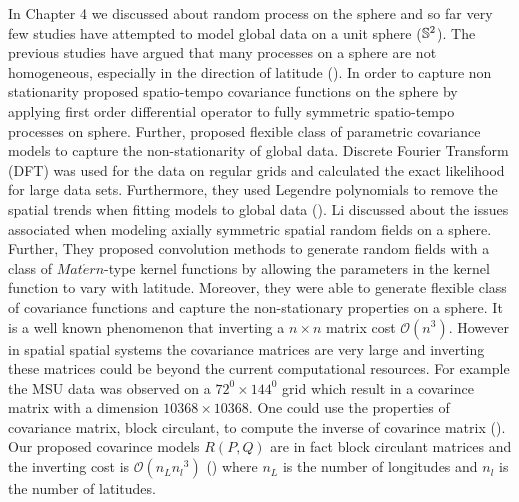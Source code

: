 
In Chapter 4 we discussed about random process on the sphere and so far very few studies have attempted to model global data on a unit sphere ($\mathbb{S}^2$). The previous studies have argued that many processes on a sphere are not homogeneous, especially in the direction of latitude (\cite{Stein2007}). In order to capture non stationarity \cite{JunStein2007} proposed spatio-tempo covariance functions on the sphere by applying first order differential operator to fully symmetric spatio-tempo processes on sphere.  Further, \cite{JunStein2008} proposed flexible class of parametric covariance models to capture the non-stationarity of global data. Discrete Fourier Transform (DFT) was used for the data on regular grids and calculated the exact likelihood for large data sets. Furthermore, they used Legendre polynomials to remove the spatial trends when fitting models to global data (\cite{Stein2007}). Li \cite{Li2013} discussed about the issues associated when modeling axially symmetric spatial random fields on a sphere. Further, They proposed convolution methods to generate random fields with a class of $Mat\acute{e}rn$-type kernel functions by allowing the parameters in the kernel function to vary with latitude. Moreover, they were able to generate flexible class of covariance functions and capture the non-stationary properties on a sphere. It is a well known phenomenon that inverting a $n\times n$ matrix cost $\mathcal{O}(n^3)$. However in spatial spatial systems the covariance matrices are very large and inverting these matrices could be beyond the current computational resources. For example the MSU data was observed on a $72^0\times 144^0$ grid which result in a covarince matrix with a dimension $10368\times 10368$. One could use the properties of covariance matrix, block circulant, to compute the inverse of covarince matrix (\cite{DeMazancourt1983,Vescovo1997, Tee2005, JunStein2008, Li2013}). Our proposed covarince models $R(P,Q)$ are in fact block circulant matrices and the inverting cost is $\mathcal{O}(n_Ln{_l}^3)$ (\cite{Li2013}) where $n_L$ is the number of longitudes and $n_l$ is the number of latitudes. 


